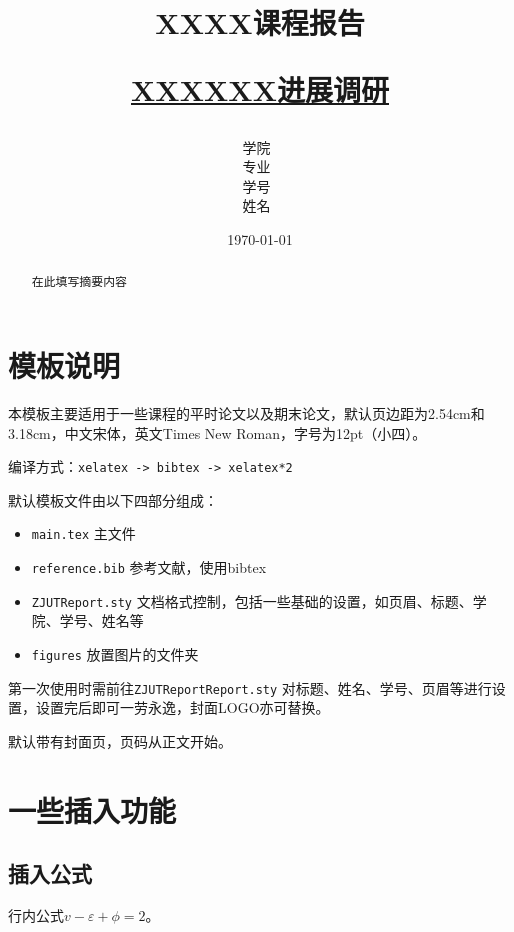 \documentclass[12pt,hyperref,a4paper,UTF8]{ctexart}
\title{ 
        \vspace{1cm}
        \heiti \Huge \textbf{{XXXX课程报告}} \par
        \vspace{1cm} 
        \heiti \Large {\underline{XXXXXX进展调研}}    
        \vspace{3cm}
    }
\author{
        \vspace{0.5cm}
        \kaishu\Large 学院\ \dlmu[9cm]{计算机学院} \\ %
        \vspace{0.5cm}
        \kaishu\Large 专业\ \dlmu[9cm]{计算机科学与技术} \\ %
        \vspace{0.5cm}
        \kaishu\Large 学号\ \dlmu[9cm]{2023XXXXXX} \qquad  \\ %
        \vspace{0.5cm}
        \kaishu\Large 姓名\ \dlmu[9cm]{XXX} \qquad \\ %
    }
\date{\today} %
\begin{document}
\cover
\thispagestyle{empty} %
\newpage
\begin{abstract}

在此填写摘要内容

\end{abstract}

\thispagestyle{empty} %

\newpage
\tableofcontents

\newpage
\setcounter{page}{1} %


\section{模板说明}
本模板主要适用于一些课程的平时论文以及期末论文，默认页边距为2.54cm和3.18cm，中文宋体，英文Times New Roman，字号为12pt（小四）。

编译方式：\verb|xelatex -> bibtex -> xelatex*2|


默认模板文件由以下四部分组成：
\begin{itemize}
    \item \texttt{main.tex} 主文件
    \item \texttt{reference.bib} 参考文献，使用bibtex
    \item \texttt{ZJUTReport.sty} 文档格式控制，包括一些基础的设置，如页眉、标题、学院、学号、姓名等
    \item \texttt{figures} 放置图片的文件夹
\end{itemize}

第一次使用时需前往\texttt{ZJUTReportReport.sty} 对标题、姓名、学号、页眉等进行设置，设置完后即可一劳永逸，封面LOGO亦可替换。

默认带有封面页，页码从正文开始。

\section{一些插入功能}
\subsection{插入公式}
行内公式$v-\varepsilon+\phi=2$。
\end{document}
